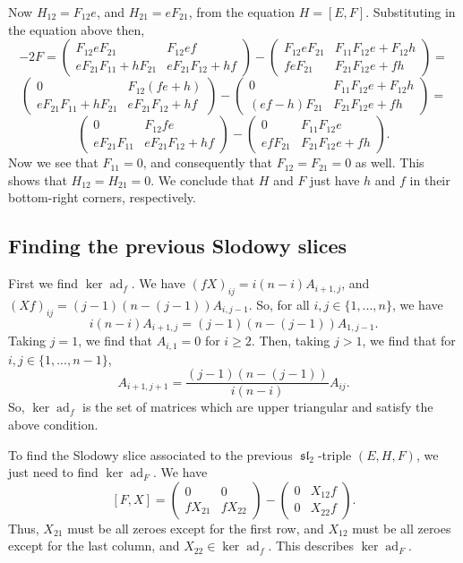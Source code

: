 \documentclass[12pt,psamsfonts]{article}
\DeclareMathOperator{\spl}{\mathfrak{sl}}
\DeclareMathOperator{\ad}{ad}
\begin{document}
Now \(H_{12} = F_{12}e\), and \(H_{21} = eF_{21}\), from the equation \(H = [E, F]\).
Substituting in the equation above then,
\[-2F = \begin{pmatrix}
    F_{12} e F_{21} & F_{12}e f \\
    eF_{21} F_{11} + h F_{21} & eF_{21} F_{12} + hf
\end{pmatrix} - \begin{pmatrix}
    F_{12} e F_{21} & F_{11} F_{12}e + F_{12} h \\
    f eF_{21} & F_{21} F_{12}e + fh
\end{pmatrix} =\]
\[\begin{pmatrix}
    0 & F_{12}(fe + h) \\
    eF_{21} F_{11} + h F_{21} & eF_{21} F_{12} + hf
\end{pmatrix} - \begin{pmatrix}
    0 & F_{11} F_{12}e + F_{12} h \\
    (ef - h)F_{21} & F_{21} F_{12}e + fh
\end{pmatrix} =\]
\[\begin{pmatrix}
    0 & F_{12}fe \\
    eF_{21} F_{11} & eF_{21} F_{12} + hf
\end{pmatrix} - \begin{pmatrix}
    0 & F_{11} F_{12}e \\
    ef F_{21} & F_{21} F_{12}e + fh
\end{pmatrix}.\]
Now we see that \(F_{11} = 0\), and consequently that \(F_{12} = F_{21} = 0\) as well.
This shows that \(H_{12} = H_{21} = 0\).
We conclude that \(H\) and \(F\) just have \(h\) and \(f\) in their bottom-right corners, respectively.

\subsection{Finding the previous Slodowy slices}
First we find \(\ker \ad_f\).
We have \((fX)_{ij} = i (n - i) A_{i + 1,j}\), and \((Xf)_{ij} = (j - 1) (n - (j - 1)) A_{i, j - 1}\).
So, for all \(i, j \in \{1, ..., n\}\), we have 
\[i(n - i)A_{i + 1,j} = (j - 1)(n - (j - 1))A_{1, j - 1}.\]
Taking \(j = 1\), we find that \(A_{i,1} = 0\) for \(i \geq 2\).
Then, taking \(j > 1\), we find that for \(i, j \in \{1, ..., n - 1\}\),
\[A_{i + 1, j + 1} = \frac{(j - 1)(n - (j - 1))}{i(n - i)} A_{ij}.\]
So, \(\ker\ad_f\) is the set of matrices which are upper triangular and satisfy the above condition.
\par To find the Slodowy slice associated to the previous \(\spl_2\)-triple \((E, H, F)\), we just need to find \(\ker\ad_F\).
We have 
\[[F, X] = \begin{pmatrix}
    0 & 0 \\
    f X_{21} & fX_{22}
\end{pmatrix} - \begin{pmatrix}
    0 & X_{12} f\\
    0 & X_{22} f
\end{pmatrix}.\]
Thus, \(X_{21}\) must be all zeroes except for the first row, and \(X_{12}\) must be all zeroes except for the last column, and \(X_{22} \in \ker\ad_f\).
This describes \(\ker\ad_F\).
\end{document}
